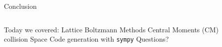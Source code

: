 \begin{frame}{Conclusion}
\begin{columns}
\begin{center}
\begin{outline}
\1 Today we covered:
\2 Lattice Boltzmann Methods
\2 Central Moments (CM) collision Space
\2 Code generation with \lstinline{sympy}
\1 Questions?
\end{outline}
\end{center}

\begin{center}
\end{center}

\end{columns}
\end{frame}
